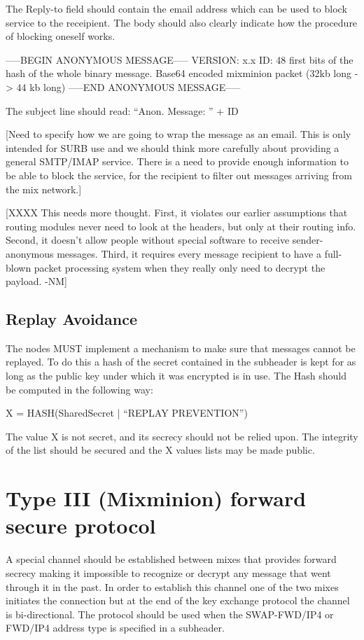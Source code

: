 The Reply-to field should contain the email address which can be used
to block service to the receipient. The body should also clearly
indicate how the procedure of blocking oneself works.

-----BEGIN ANONYMOUS MESSAGE-----
VERSION: x.x
ID: 48 first bits of the hash of the whole binary message.
Base64 encoded mixminion packet (32kb long -> 44 kb long)
-----END ANONYMOUS MESSAGE-----

The subject line should read: ``Anon. Message: '' + ID

[Need to specify how we are going to wrap the message
 as an email. This is only intended for SURB use and
 we should think more carefully about providing a 
 general SMTP/IMAP service.
 There is a need to provide enough information to be 
 able to block the service, for the recipient to
 filter out messages arriving from the mix network.]

[XXXX This needs more thought.  First, it violates our earlier
      assumptions that routing modules never need to look at the
      headers, but only at their routing info.  Second, it doesn't
      allow people without special software to receive
      sender-anonymous messages.  Third, it requires every message
      recipient to have a full-blown packet processing system when
      they really only need to decrypt the payload.  -NM]

\subsection{Replay Avoidance}

The nodes MUST implement a mechanism to make sure that messages cannot
be replayed. To do this a hash of the secret contained in the
subheader is kept for as long as the public key under which it was
encrypted is in use. The Hash should be computed in the following way:

X = HASH(SharedSecret | ``REPLAY PREVENTION'')

The value X is not secret, and its secrecy should not be relied upon.
The integrity of the list should be secured and the X values lists may
be made public.

\section{Type III (Mixminion) forward secure protocol}

A special channel should be established between mixes that provides
forward secrecy making it impossible to recognize or decrypt any
message that went through it in the past. In order to establish this
channel one of the two mixes initiates the connection but at the end
of the key exchange protocol the channel is bi-directional. The
protocol should be used when the SWAP-FWD/IP4 or FWD/IP4 address type
is specified in a subheader.

